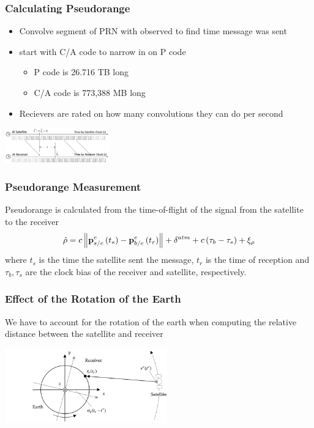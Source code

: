 \documentclass{beamer}
\newcommand{\norm}[1]{\left\lVert#1\right\rVert}
\begin{document}
\begin{frame} \frametitle{Calculating Pseudorange}
\begin{itemize}
	\item Convolve segment of PRN with observed to find time message was sent
	\item start with C/A code to narrow in on P code
	\begin{itemize}
		\item P code is 26.716 TB long
		\item C/A code is 773,388 MB long
	\end{itemize}
	\item Recievers are rated on how many convolutions they can do per second
\end{itemize}
\centering
	\includegraphics[width=45mm]{images/pseudorange_model.png}
\end{frame}

\begin{frame}\frametitle{Pseudorange Measurement}
Pseudorange is calculated from the time-of-flight of the signal from the satellite to the receiver
\begin{equation}
	\hat{\rho} = c\norm{\p_{s/e}^{e}\left(t_s\right)-\p_{b/e}^{e}\left(t_r\right)} + \delta^{atm} + c\left(\tau_{b}-\tau_{s}\right)+\xi_{\rho}
\end{equation}
where $t_s$ is the time the satellite sent the message, $t_r$ is the time of reception and $\tau_{b},\tau_{s}$ are the clock
bias of the receiver and satellite, respectively.
\end{frame}

\begin{frame}\frametitle{Effect of the Rotation of the Earth}
We have to account for the rotation of the earth when computing the relative distance between the satellite and receiver

\centering
\includegraphics[width=70mm]{images/earth-rotation.png}
\end{frame}
\end{document}
